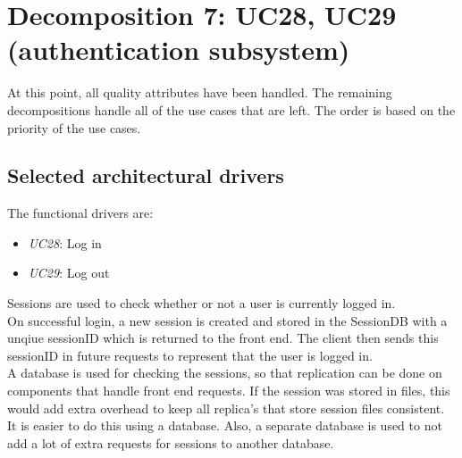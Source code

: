 \section{Decomposition 7: UC28, UC29 (authentication subsystem)}
    At this point, all quality attributes have been handled. The remaining
    decompositions handle all of the use cases that are left. The order
    is based on the priority of the use cases.


\subsection*{Selected architectural drivers}
    The functional drivers are:
    \begin{itemize}
        \item \emph{UC28}: Log in
        \item \emph{UC29}: Log out
    \end{itemize}

    Sessions are used to check whether or not a user is currently logged in. \\
    On successful login, a new session is created and stored in the SessionDB with
    a unqiue sessionID which is returned to the front end. The client then sends this
    sessionID in future requests to represent that the user is logged in. \\
    A database is used for checking the sessions, so that replication can be done
    on components that handle front end requests. If the session was stored in files,
    this would add extra overhead to keep all replica's that store session files consistent.
    It is easier to do this using a database. Also, a separate database is used
    to not add a lot of extra requests for sessions to another database.


